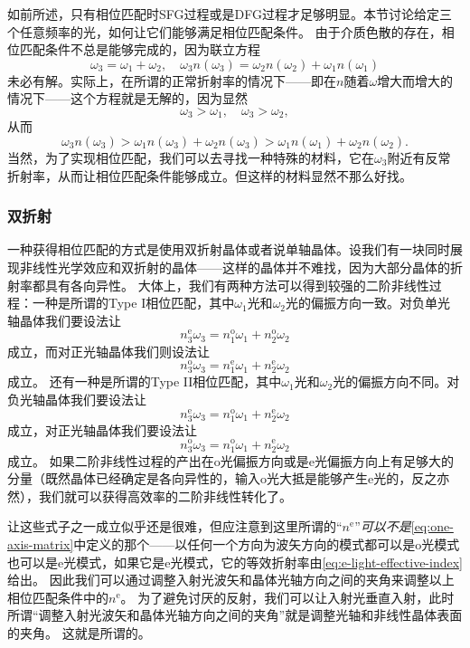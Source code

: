 如前所述，只有相位匹配时SFG过程或是DFG过程才足够明显。本节讨论给定三个任意频率的光，如何让它们能够满足相位匹配条件。
由于介质色散的存在，相位匹配条件不总是能够完成的，因为联立方程
\[
    \omega_3 = \omega_1 + \omega_2, \quad \omega_3 n(\omega_3) = \omega_2 n(\omega_2) + \omega_1 n(\omega_1)
\]
未必有解。实际上，在所谓的正常折射率的情况下——即在$n$随着$\omega$增大而增大的情况下——这个方程就是无解的，因为显然
\[
    \omega_3 > \omega_1, \quad \omega_3 > \omega_2,
\]
从而
\[
    \omega_3 n(\omega_3) > \omega_1 n(\omega_3) + \omega_2 n(\omega_3) > \omega_1 n(\omega_1) + \omega_2 n(\omega_2).
\]
当然，为了实现相位匹配，我们可以去寻找一种特殊的材料，它在$\omega_3$附近有反常折射率，从而让相位匹配条件能够成立。但这样的材料显然不那么好找。

\subsubsection{双折射}

一种获得相位匹配的方式是使用双折射晶体或者说单轴晶体。设我们有一块同时展现非线性光学效应和双折射的晶体——这样的晶体并不难找，因为大部分晶体的折射率都具有各向异性。
大体上，我们有两种方法可以得到较强的二阶非线性过程：一种是所谓的Type I相位匹配，其中$\omega_1$光和$\omega_2$光的偏振方向一致。对负单光轴晶体我们要设法让
\begin{equation}
    n^\text{e}_3 \omega_3 = n^\text{o}_1 \omega_1 + n^\text{o}_2 \omega_2
\end{equation}
成立，而对正光轴晶体我们则设法让
\begin{equation}
    n^\text{o}_3 \omega_3 = n^\text{e}_1 \omega_1 + n^\text{e}_2 \omega_2
\end{equation}
成立。
还有一种是所谓的Type II相位匹配，其中$\omega_1$光和$\omega_2$光的偏振方向不同。对负光轴晶体我们要设法让
\begin{equation}
    n^\text{e}_3 \omega_3 = n^\text{o}_1 \omega_1 + n^\text{e}_2 \omega_2
\end{equation}
成立，对正光轴晶体我们要设法让
\begin{equation}
    n^\text{o}_3 \omega_3 = n^\text{o}_1 \omega_1 + n^\text{e}_2 \omega_2
\end{equation}
成立。
如果二阶非线性过程的产出在o光偏振方向或是e光偏振方向上有足够大的分量（既然晶体已经确定是各向异性的，输入o光大抵是能够产生e光的，反之亦然），我们就可以获得高效率的二阶非线性转化了。

让这些式子之一成立似乎还是很难，但应注意到这里所谓的“$n^\text{e}$”\emph{可以不是}\eqref{eq:one-axis-matrix}中定义的那个——以任何一个方向为波矢方向的模式都可以是o光模式也可以是e光模式，如果它是e光模式，它的等效折射率由\eqref{eq:e-light-effective-index}给出。
因此我们可以通过调整入射光波矢和晶体光轴方向之间的夹角来调整以上相位匹配条件中的$n^\text{e}$。
为了避免讨厌的反射，我们可以让入射光垂直入射，此时所谓“调整入射光波矢和晶体光轴方向之间的夹角”就是调整光轴和非线性晶体表面的夹角。
这就是所谓的。

